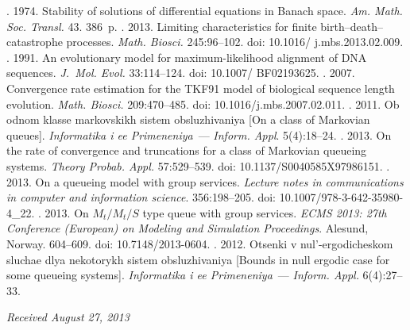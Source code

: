 \begin{multicols}{2}
{{\begin{thebibliography}{99}
. 1974. Stability of solutions of differential
equations in Banach space. \textit{Am. Math. Soc. Transl.} 43. 386~p.
. 2013. Limiting characteristics
for finite birth--death--catastrophe processes. \textit{Math. Biosci.} 245:96--102. 
doi: 10.1016/ j.mbs.2013.02.009.
. 1991. An evolutionary model for
maximum-likelihood alignment of DNA sequences. \textit{J.~Mol. Evol.} 33:114--124. 
doi: 10.1007/ BF02193625.
. 2007. Convergence rate estimation for
the TKF91 model of biological sequence length evolution. \textit{Math. Biosci.}
209:470--485. doi: 10.1016/j.mbs.2007.02.011.
.
2011. Ob odnom klasse markovskikh sistem obsluzhivaniya [On a class of Markovian queues].
\textit{Informatika i ee Primeneniya}~--- \textit{Inform. Appl}. 5(4):18--24.
. 2013.
On the rate of convergence and truncations for a class of Markovian queueing systems.
\textit{Theory Probab. Appl.} 57:529--539. doi: 10.1137/S0040585X97986151.
.
2013. On a queueing model with group services.
\textit{Lecture notes in communications in computer and information science}. 
356:198--205. doi: 10.1007/978-3-642-35980-4\_22.
.
2013. On $M_t/M_t/S$ type queue with group services.
\textit{ECMS 2013: 27th  Conference (European) on Modeling and Simulation Proceedings}.
Alesund, Norway. 604--609. doi: 10.7148/2013-0604.
. 2012.
Otsenki v nul'-ergodicheskom slu\-chae dlya nekotorykh sistem obsluzhivaniya
[Bounds in null ergodic case for some queueing systems].
\textit{Informatika i ee Primeneniya}~--- \textit{Inform. Appl.} 6(4):27--33.

\end{thebibliography}
} }

\end{multicols}

\vspace*{-9pt}

\hfill{\small\textit{Received August 27, 2013}}


